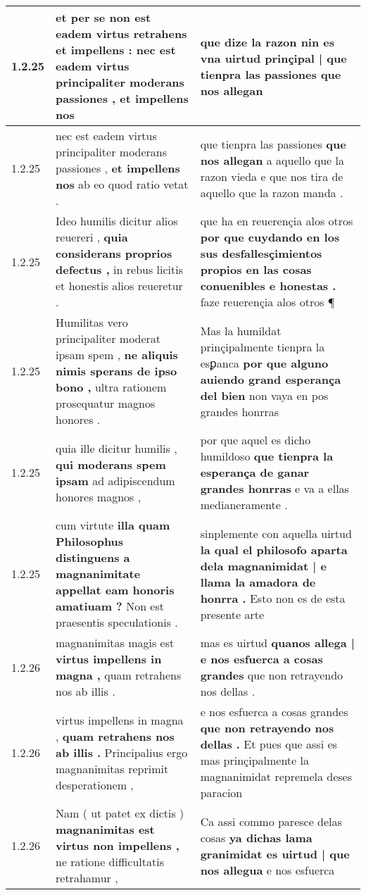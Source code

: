\begin{tabular}{|p{1cm}|p{6.5cm}|p{6.5cm}|}
1.2.25 & et per se non est eadem virtus retrahens et impellens : \textbf{ nec est eadem virtus principaliter moderans passiones , } et impellens nos & que dize la razon \textbf{ nin es vna uirtud prinçipal | que tienpra las passiones } que nos allegan \\\hline
1.2.25 & nec est eadem virtus principaliter moderans passiones , \textbf{ et impellens nos } ab eo quod ratio vetat . & que tienpra las passiones \textbf{ que nos allegan } a aquello que la razon vieda e que nos tira de aquello que la razon manda . \\\hline
1.2.25 & Ideo humilis dicitur alios reuereri , \textbf{ quia considerans proprios defectus , } in rebus licitis et honestis alios reueretur . & que ha en reuerençia alos otros \textbf{ por que cuydando en los sus desfallesçimientos propios en las cosas conuenibles e honestas . } faze reuerençia alos otros ¶ \\\hline
1.2.25 & Humilitas vero principaliter moderat ipsam spem , \textbf{ ne aliquis nimis sperans de ipso bono , } ultra rationem prosequatur magnos honores . & Mas la humildat prinçipalmente tienpra la esꝑanca \textbf{ por que alguno auiendo grand esperança del bien } non vaya en pos grandes honrras \\\hline
1.2.25 & quia ille dicitur humilis , \textbf{ qui moderans spem ipsam } ad adipiscendum honores magnos , & por que aquel es dicho humildoso \textbf{ que tienpra la esperança de ganar grandes honrras } e va a ellas medianeramente . \\\hline
1.2.25 & cum virtute \textbf{ illa quam Philosophus distinguens a magnanimitate appellat eam honoris amatiuam ? } Non est praesentis speculationis . & sinplemente con aquella uirtud \textbf{ la qual el philosofo aparta dela magnanimidat | e llama la amadora de honrra . } Esto non es de esta presente arte \\\hline
1.2.26 & magnanimitas magis est \textbf{ virtus impellens in magna , } quam retrahens nos ab illis . & mas es uirtud \textbf{ quanos allega | e nos esfuerca a cosas grandes } que non retrayendo nos dellas . \\\hline
1.2.26 & virtus impellens in magna , \textbf{ quam retrahens nos ab illis . } Principalius ergo magnanimitas reprimit desperationem , & e nos esfuerca a cosas grandes \textbf{ que non retrayendo nos dellas . } Et pues que assi es mas prinçipalmente la magnanimidat repremela deses paracion \\\hline
1.2.26 & Nam ( ut patet ex dictis ) \textbf{ magnanimitas est virtus non impellens , } ne ratione difficultatis retrahamur , & Ca assi commo paresce delas cosas \textbf{ ya dichas lama granimidat es uirtud | que nos allegua } e nos esfuerca \\\hline

\end{tabular}

